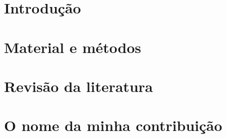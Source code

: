 \documentclass[tcc,baec]{unipampa}
\begin{document}
% 
%

\tableofcontents

% 
%


\chapter{Introdução}
\label{cap-introducao}


\chapter{Material e métodos}
\label{cap-metodologia}


\chapter{Revisão da literatura}
\label{cap-revisao-bibliografica}
\label{cap-trabalhos-relacionados}
%
%

\chapter{O nome da minha contribuição}
\label{cap-desenvolvimento}
%

\label{cap-minha-contribuicao}
%
\end{document}

